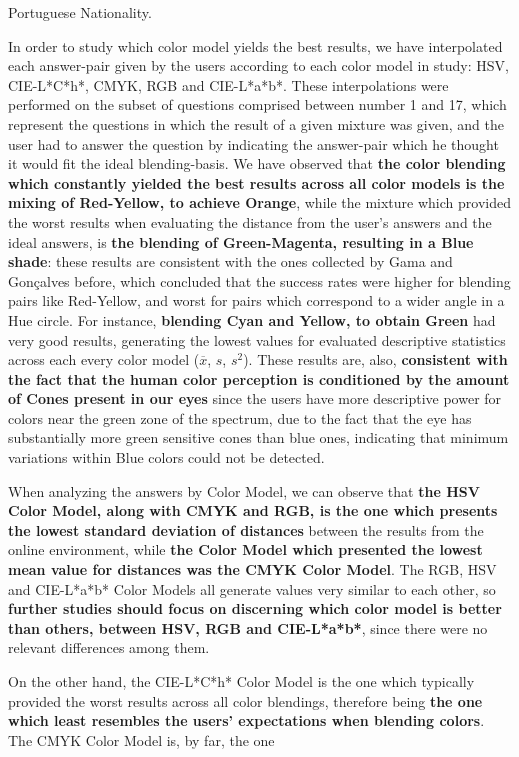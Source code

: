 Portuguese Nationality. \par
%
In order to study which color model yields the best results, we have interpolated each answer-pair given by the users according to each color model in study: HSV, CIE-L*C*h*, CMYK, RGB and CIE-L*a*b*. These interpolations were performed on the subset of questions comprised between
number 1 and 17, which represent the questions in which the result of a given mixture was given, and the user had to answer the question by indicating the answer-pair which he thought it would fit the ideal blending-basis.
We have observed that \textbf{the color blending which constantly yielded the best results across all color models is the mixing of Red-Yellow, to achieve Orange}, while the mixture which provided the worst results when evaluating the distance from the user's
answers and the ideal answers, is \textbf{the blending of Green-Magenta, resulting in a Blue shade}: these results are consistent with the ones collected by Gama and Gonçalves \cite{Gama20141} before, which concluded that the success rates were higher for blending pairs
like Red-Yellow, and worst for pairs which correspond to a wider angle in a Hue circle. For instance, \textbf{blending Cyan and Yellow, to obtain Green} had very good results, generating the lowest values for evaluated descriptive statistics across each
every color model ($\overline{x}$, $s$, $s^2$). These results are, also, \textbf{consistent with the fact that the human color perception is conditioned by the amount of Cones present in our eyes} since the users have more descriptive power for colors near the
green zone of the spectrum, due to the fact that the eye has substantially more green sensitive cones than blue ones, indicating that minimum variations within Blue colors could not be detected. \par
%
When analyzing the answers by Color Model, we can observe that \textbf{the HSV Color Model, along with CMYK and RGB, is the one which presents the lowest standard deviation of distances} between the results from the online environment, while \textbf{the Color Model
which presented the lowest mean value for distances was the CMYK Color Model}. The RGB, HSV and CIE-L*a*b* Color Models all generate values very similar to each other, so \textbf{further studies should focus on discerning which color model is better than others, between
HSV, RGB and CIE-L*a*b*}, since there were no relevant differences among them. \par
%
On the other hand, the CIE-L*C*h* Color Model is the one which typically provided the worst results across all color blendings, therefore being \textbf{the one which least resembles the users' expectations when blending colors}. The CMYK Color Model is, by far, the one
